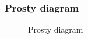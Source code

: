 \documentclass[10pt,t]{beamer}
\begin{document}
\begin{frame}
  \frametitle{Prosty diagram}


  \begin{figure}

    \centering

    \begin{tikzpicture}[node distance=0.5cm]












    \end{tikzpicture}


    \caption{Prosty diagram}

  \end{figure}

\end{frame}
\end{document}
